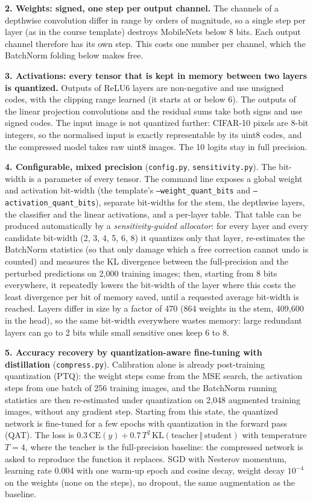 \documentclass[11pt,a4paper]{article}
\begin{document}
\textbf{2. Weights: signed, one step per output channel.} The channels of a depthwise convolution differ in range by orders of magnitude, so a single step per layer (as in the course template) destroys MobileNets below 8 bits. Each output channel therefore has its own step. This costs one number per channel, which the BatchNorm folding below makes free.

\textbf{3. Activations: every tensor that is kept in memory between two layers is quantized.} Outputs of ReLU6 layers are non-negative and use unsigned codes, with the clipping range learned (it starts at or below 6). The outputs of the linear projection convolutions and the residual sums take both signs and use signed codes. The input image is not quantized further: CIFAR-10 pixels are 8-bit integers, so the normalised input is exactly representable by its uint8 codes, and the compressed model takes raw uint8 images. The 10 logits stay in full precision.

\textbf{4. Configurable, mixed precision} (\texttt{config.py}, \texttt{sensitivity.py}). The bit-width is a parameter of every tensor. The command line exposes a global weight and activation bit-width (the template's \texttt{--weight\_quant\_bits} and \texttt{--activation\_quant\_bits}), separate bit-widths for the stem, the depthwise layers, the classifier and the linear activations, and a per-layer table. That table can be produced automatically by a \emph{sensitivity-guided allocator}: for every layer and every candidate bit-width (2, 3, 4, 5, 6, 8) it quantizes only that layer, re-estimates the BatchNorm statistics (so that only damage which a free correction cannot undo is counted) and measures the KL divergence between the full-precision and the perturbed predictions on 2{,}000 training images; then, starting from 8 bits everywhere, it repeatedly lowers the bit-width of the layer where this costs the least divergence per bit of memory saved, until a requested average bit-width is reached. Layers differ in size by a factor of 470 (864 weights in the stem, 409{,}600 in the head), so the same bit-width everywhere wastes memory: large redundant layers can go to 2 bits while small sensitive ones keep 6 to 8.

\textbf{5. Accuracy recovery by quantization-aware fine-tuning with distillation} (\texttt{compress.py}). Calibration alone is already post-training quantization (PTQ): the weight steps come from the MSE search, the activation steps from one batch of 256 training images, and the BatchNorm running statistics are then re-estimated under quantization on 2{,}048 augmented training images, without any gradient step. Starting from this state, the quantized network is fine-tuned for a few epochs with quantization in the forward pass (QAT). The loss is $0.3\,\mathrm{CE}(y) + 0.7\,T^2\,\mathrm{KL}(\text{teacher}\,\Vert\,\text{student})$ with temperature $T=4$, where the teacher is the full-precision baseline: the compressed network is asked to reproduce the function it replaces. SGD with Nesterov momentum, learning rate 0.004 with one warm-up epoch and cosine decay, weight decay $10^{-4}$ on the weights (none on the steps), no dropout, the same augmentation as the baseline.
\end{document}

